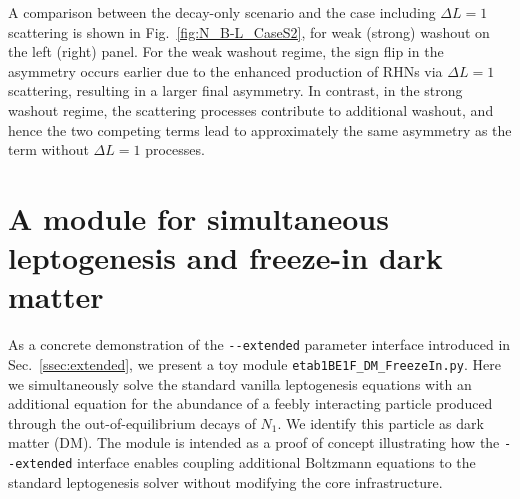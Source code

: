 \documentclass[12pt, a4paper]{article}
\begin{document}
A comparison between the decay-only scenario and the case including $\Delta L = 1$ scattering is shown in Fig.~\ref{fig:N_B-L_CaseS2}, for weak (strong) washout on the left (right) panel. For the weak washout regime, the sign flip in the asymmetry occurs earlier due to the enhanced production of RHNs via $\Delta L = 1$ scattering, resulting in a larger final asymmetry. In contrast, in the strong washout regime, the scattering processes contribute to additional washout, and hence the two competing terms lead to approximately the same asymmetry as the term without $\Delta L=1$ processes. 


\section{A module for simultaneous leptogenesis and freeze-in dark matter}
\label{sec:DM}

As a concrete demonstration of the \texttt{-{}-extended} parameter interface introduced in Sec.~\ref{ssec:extended}, we present a toy module \texttt{etab1BE1F\_DM\_FreezeIn.py}. Here we simultaneously solve the standard vanilla leptogenesis equations with an additional equation for the abundance of a feebly interacting particle produced through the out-of-equilibrium decays of $N_1$. We identify this particle as dark matter (DM). The module is intended as a proof of concept illustrating how the \texttt{-{}-extended} interface enables coupling additional Boltzmann equations to the standard leptogenesis solver without modifying the core infrastructure.
\end{document}
